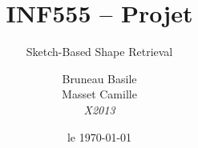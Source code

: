 \documentclass[12pt, a4paper, oneside]{article}
\title{INF555 -- Projet}
\subtitle{Sketch-Based Shape Retrieval}
\date{le \today}
\author{Bruneau Basile\\Masset Camille\\\emph{X2013}}
\begin{document}
\renewcommand{\labelitemi}{\starredbullet}

\maketitle

\end{document}
